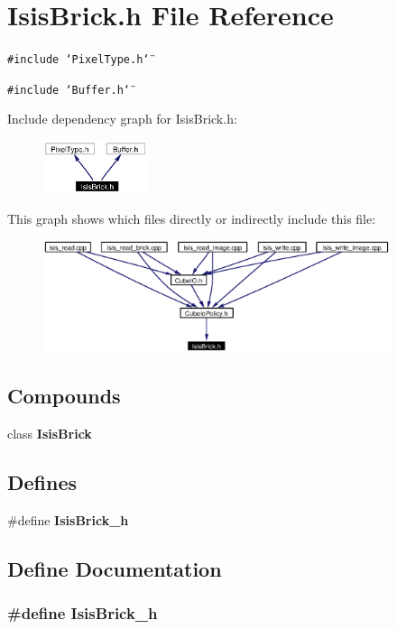 \section{Isis\-Brick.h File Reference}
\label{IsisBrick_8h}
{\tt \#include \char`\"{}Pixel\-Type.h\char`\"{}}\par
{\tt \#include \char`\"{}Buffer.h\char`\"{}}\par


Include dependency graph for Isis\-Brick.h:\begin{figure}[H]
\begin{center}
\leavevmode
\includegraphics[width=86pt]{IsisBrick_8h__incl}
\end{center}
\end{figure}


This graph shows which files directly or indirectly include this file:\begin{figure}[H]
\begin{center}
\leavevmode
\includegraphics[width=288pt]{IsisBrick_8h__dep__incl}
\end{center}
\end{figure}
\subsection*{Compounds}
\begin{CompactItemize}
\item 
class {\bf Isis\-Brick}
\end{CompactItemize}
\subsection*{Defines}
\begin{CompactItemize}
\item 
\#define {\bf Isis\-Brick\_\-h}
\end{CompactItemize}


\subsection{Define Documentation}
\subsubsection{\setlength{\rightskip}{0pt plus 5cm}\#define Isis\-Brick\_\-h}\label{IsisBrick_8h_a0}


